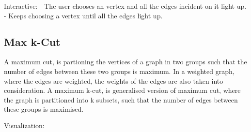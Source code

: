 Interactive: - The user chooses an vertex and all the edges incident on
it light up. - Keeps choosing a vertex until all the edges light up.

\hypertarget{max-k-cut}{%
\subsection{Max k-Cut}\label{max-k-cut}}

A maximum cut, is partioning the vertices of a graph in two groups such
that the number of edges between these two groups is maximum. In a
weighted graph, where the edges are weighted, the weights of the edges
are also taken into consideration. A maximum k-cut, is generalised
version of maximum cut, where the graph is partitioned into k subsets,
such that the number of edges between these groups is maximised.

Visualization:

